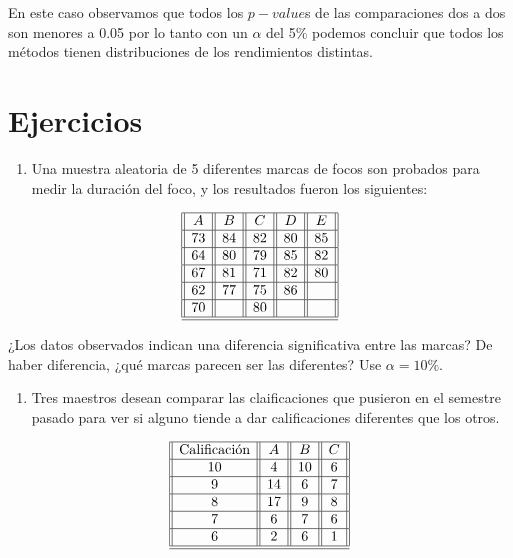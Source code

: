 \documentclass[
  a4paper,
  oneside,
  openany]{book}
\providecommand{\tightlist}{%
  \setlength{\itemsep}{0pt}\setlength{\parskip}{0pt}}
\begin{document}
En este caso observamos que todos los \(p-value\)s de las comparaciones dos a dos son menores a 0.05 por lo tanto con un \(\alpha\) del 5\% podemos concluir que todos los métodos tienen distribuciones de los rendimientos distintas.

\hypertarget{ejercicios-6}{%
\section{Ejercicios}\label{ejercicios-6}}

\begin{enumerate}
\def\labelenumi{\arabic{enumi}.}
\tightlist
\item
  Una muestra aleatoria de 5 diferentes marcas de focos son probados para medir la duración del foco, y los resultados fueron los siguientes:
\end{enumerate}

\[
\begin{array}{||c| |c| |c| |c||c||} 
\hline 
A & B&C&D&E \\ 
 \hline
73&84&82&80&85\\
 \hline
64&80&79&85&82\\
 \hline
67&81&71&82&80\\
 \hline
62&77&75&86&\\
 \hline
70&&80&&\\
\hline
\hline
\end{array}
\]

¿Los datos observados indican una diferencia significativa entre las marcas? De haber diferencia, ¿qué marcas parecen ser las diferentes? Use \(\alpha=10\%.\)

\begin{enumerate}
\def\labelenumi{\arabic{enumi}.}
\setcounter{enumi}{1}
\tightlist
\item
  Tres maestros desean comparar las claificaciones que pusieron en el semestre pasado para ver si alguno tiende a dar calificaciones diferentes que los otros.
\end{enumerate}

\[
\begin{array}{||c| |c| |c| |c||} 
\hline 
\mbox{Calificación} & A & B&C \\  
 \hline
10&4&10&6\\
 \hline
9&14&6&7\\
 \hline
8&17&9&8\\
 \hline
7&6&7&6\\
 \hline
6&2&6&1\\
\hline
\hline
\end{array}
\]
\end{document}
